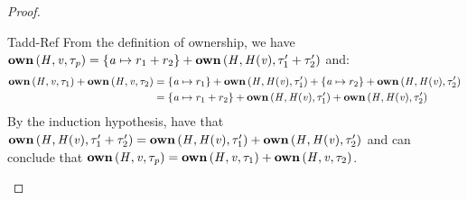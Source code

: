 \begin{proof}
\begin{rncase}{Tadd-Ref}
    From the definition of ownership, we have $\mathbf{own} \, (  \mathit{H}  ,  \mathit{v}  ,  \tau_{\mathit{p}}  )  =  \{  \mathit{a}  \mapsto  r_{{\mathrm{1}}}  +  r_{{\mathrm{2}}}  \}  +  \mathbf{own} \, (  \mathit{H}  ,  \mathit{H}  (  \mathit{v}  )  ,  \tau'_{{\mathrm{1}}}  +  \tau'_{{\mathrm{2}}}  )$ and:
    \begin{align*}
      \mathbf{own} \, (  \mathit{H}  ,  \mathit{v}  ,  \tau_{{\mathrm{1}}}  )  +  \mathbf{own} \, (  \mathit{H}  ,  \mathit{v}  ,  \tau_{{\mathrm{2}}}  ) & = \{  \mathit{a}  \mapsto  r_{{\mathrm{1}}}  \}  +  \mathbf{own} \, (  \mathit{H}  ,  \mathit{H}  (  \mathit{v}  )  ,  \tau'_{{\mathrm{1}}}  )  +  \{  \mathit{a}  \mapsto  r_{{\mathrm{2}}}  \}  +  \mathbf{own} \, (  \mathit{H}  ,  \mathit{H}  (  \mathit{v}  )  ,  \tau'_{{\mathrm{2}}}  ) \\
                                    & = \{  \mathit{a}  \mapsto  r_{{\mathrm{1}}}  +  r_{{\mathrm{2}}}  \}  +  \mathbf{own} \, (  \mathit{H}  ,  \mathit{H}  (  \mathit{v}  )  ,  \tau'_{{\mathrm{1}}}  )  +  \mathbf{own} \, (  \mathit{H}  ,  \mathit{H}  (  \mathit{v}  )  ,  \tau'_{{\mathrm{2}}}  )
    \end{align*}
    By the induction hypothesis, have that $\mathbf{own} \, (  \mathit{H}  ,  \mathit{H}  (  \mathit{v}  )  ,  \tau'_{{\mathrm{1}}}  +  \tau'_{{\mathrm{2}}}  )  =  \mathbf{own} \, (  \mathit{H}  ,  \mathit{H}  (  \mathit{v}  )  ,  \tau'_{{\mathrm{1}}}  )  +  \mathbf{own} \, (  \mathit{H}  ,  \mathit{H}  (  \mathit{v}  )  ,  \tau'_{{\mathrm{2}}}  )$ and can conclude that $\mathbf{own} \, (  \mathit{H}  ,  \mathit{v}  ,  \tau_{\mathit{p}}  )  =  \mathbf{own} \, (  \mathit{H}  ,  \mathit{v}  ,  \tau_{{\mathrm{1}}}  )  +  \mathbf{own} \, (  \mathit{H}  ,  \mathit{v}  ,  \tau_{{\mathrm{2}}}  )$.
  \end{rncase}
\end{proof}

